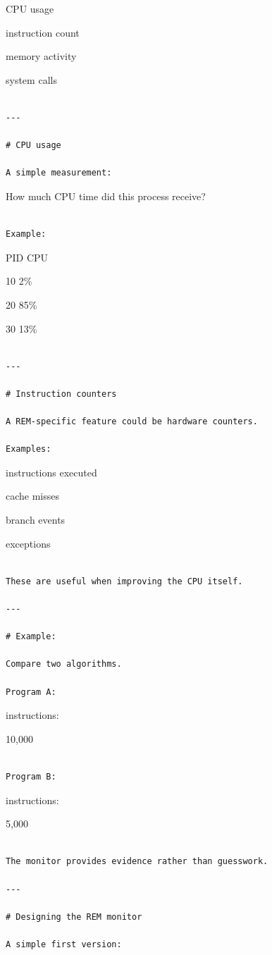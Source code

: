 \documentclass[
  oneside,
  openany]{book}
\begin{document}
CPU usage

instruction count

memory activity

system calls

\begin{verbatim}

---

# CPU usage

A simple measurement:
\end{verbatim}

How much CPU time did this process receive?

\begin{verbatim}

Example:
\end{verbatim}

PID CPU

10 2\%

20 85\%

30 13\%

\begin{verbatim}

---

# Instruction counters

A REM-specific feature could be hardware counters.

Examples:
\end{verbatim}

instructions executed

cache misses

branch events

exceptions

\begin{verbatim}

These are useful when improving the CPU itself.

---

# Example:

Compare two algorithms.

Program A:
\end{verbatim}

instructions:

10,000

\begin{verbatim}

Program B:
\end{verbatim}

instructions:

5,000

\begin{verbatim}

The monitor provides evidence rather than guesswork.

---

# Designing the REM monitor

A simple first version:
\end{verbatim}
\end{document}
